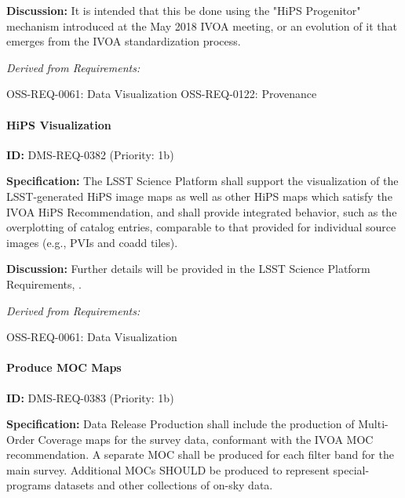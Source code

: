 \documentclass[SE,toc,lsstdraft]{lsstdoc}
\begin{document}
\textbf{Discussion:}
It is intended that this be done using the "HiPS Progenitor" mechanism introduced at the May 2018 IVOA meeting, or an evolution of it that emerges from the IVOA standardization process.

\emph{Derived from Requirements:}

OSS-REQ-0061:
Data Visualization \newline
OSS-REQ-0122:
Provenance \newline

\paragraph{HiPS Visualization}\hfill  %

\label{DMS-REQ-0382}
\textbf{ID:} DMS-REQ-0382 (Priority: 1b)

\textbf{Specification:}
The LSST Science Platform shall support the visualization of the LSST-generated HiPS image maps as well as other HiPS maps which satisfy the IVOA HiPS Recommendation, and shall provide integrated behavior, such as the overplotting of catalog entries, comparable to that provided for individual source images (e.g., PVIs and coadd tiles).

\textbf{Discussion:}
Further details will be provided in the LSST Science Platform Requirements, .

\emph{Derived from Requirements:}

OSS-REQ-0061:
Data Visualization \newline

\paragraph{Produce MOC Maps}\hfill  %

\label{DMS-REQ-0383}
\textbf{ID:} DMS-REQ-0383 (Priority: 1b)

\textbf{Specification:}
Data Release Production shall include the production of Multi-Order Coverage maps for the survey data, conformant with the IVOA MOC recommendation.  A separate MOC shall be produced for each filter band for the main survey.  Additional MOCs SHOULD be produced to represent special-programs datasets and other collections of on-sky data.
\end{document}
